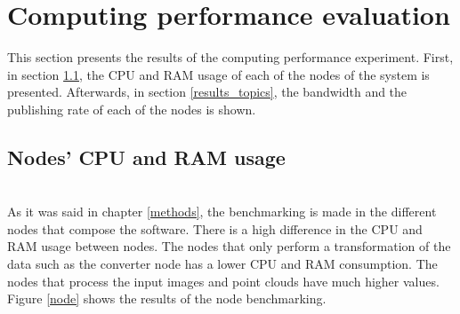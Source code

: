\section{Computing performance evaluation}
This section presents the results of the computing performance experiment. 
First, in section \ref{results_nodes}, the CPU and RAM usage of each of the nodes of the system is presented. 
Afterwards, in section \ref{results_topics}, the bandwidth and the publishing rate of each of the nodes is shown. 
		\subsection{Nodes' CPU and RAM usage}
		\label{results_nodes}
		\\

			As it was said in chapter \ref{methods}, the benchmarking is made in the different nodes that compose the software. 
			There is a high difference in the CPU and RAM usage between nodes.
			The nodes that only perform a transformation of the data such as the converter node has a lower CPU and RAM consumption.
			The nodes that process the input images and point clouds have much higher values. 
			Figure \ref{node} shows the results of the node benchmarking. 


